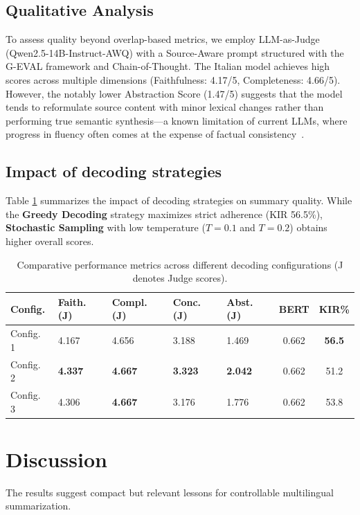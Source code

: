 \documentclass[conference]{IEEEtran}
\begin{document}
\subsection{Qualitative Analysis}
To assess quality beyond overlap-based metrics, we employ LLM-as-Judge (Qwen2.5-14B-Instruct-AWQ) with a Source-Aware prompt structured with the G-EVAL framework and Chain-of-Thought. The Italian model achieves high scores across multiple dimensions (Faithfulness: 4.17/5, Completeness: 4.66/5). However, the notably lower Abstraction Score (1.47/5) suggests that the model tends to reformulate source content with minor lexical changes rather than performing true semantic synthesis—a known limitation of current LLMs, where progress in fluency often comes at the expense of factual consistency~\cite{ladhak-etal-2022-faithful, tang-etal-2023-understanding}.

\subsection{Impact of decoding strategies}
Table \ref{tab:results_summary} summarizes the impact of decoding strategies on summary quality. While the \textbf{Greedy Decoding} strategy maximizes strict adherence (KIR 56.5\%), \textbf{Stochastic Sampling} with low temperature ($T=0.1$ and $T=0.2$) obtains higher overall scores. 

\begin{table}[h]
\caption{Comparative performance metrics across different decoding configurations (J denotes Judge scores).}
\label{tab:results_summary}
\centering
\small
\begin{tabularx}{\columnwidth}{lXXXXcc}
\toprule
\textbf{Config.} & \textbf{Faith. (J)} & \textbf{Compl. (J)} & \textbf{Conc. (J)} & \textbf{Abst. (J)} & \textbf{BERT} & \textbf{KIR\%} \\
\midrule
Config. 1 & 4.167 & 4.656 & 3.188 & 1.469 & 0.662 & \textbf{56.5} \\
Config. 2 & \textbf{4.337} & \textbf{4.667} & \textbf{3.323} & \textbf{2.042} & 0.662 & 51.2 \\
Config. 3 & 4.306 & \textbf{4.667} & 3.176 & 1.776 & 0.662 & 53.8 \\
\bottomrule
\end{tabularx}
\end{table}

\section{Discussion}
The results suggest compact but relevant lessons for controllable multilingual summarization.
\end{document}
